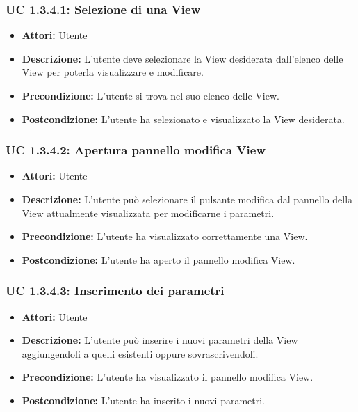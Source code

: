 \subsubsection{UC 1.3.4.1: Selezione di una View}

\begin{itemize}
\item \textbf{Attori:} Utente
\item \textbf{Descrizione:} L'utente deve selezionare la View desiderata dall'elenco delle View per poterla visualizzare e modificare.
\item \textbf{Precondizione:} L'utente si trova nel suo elenco delle View.
\item \textbf{Postcondizione:} L'utente ha selezionato e visualizzato la View desiderata.
\end{itemize}

\subsubsection{UC 1.3.4.2: Apertura pannello modifica View}

\begin{itemize}
\item \textbf{Attori:} Utente
\item \textbf{Descrizione:} L'utente può selezionare il pulsante modifica dal pannello della View attualmente visualizzata per modificarne i parametri.
\item \textbf{Precondizione:} L'utente ha visualizzato correttamente una View.
\item \textbf{Postcondizione:} L'utente ha aperto il pannello modifica View.
\end{itemize}

\subsubsection{UC 1.3.4.3: Inserimento dei parametri}

\begin{itemize}
\item \textbf{Attori:} Utente
\item \textbf{Descrizione:} L'utente può inserire i nuovi parametri della View aggiungendoli a quelli esistenti oppure sovrascrivendoli.
\item \textbf{Precondizione:} L'utente ha visualizzato il pannello modifica View.
\item \textbf{Postcondizione:} L'utente ha inserito i nuovi parametri.
\end{itemize}

